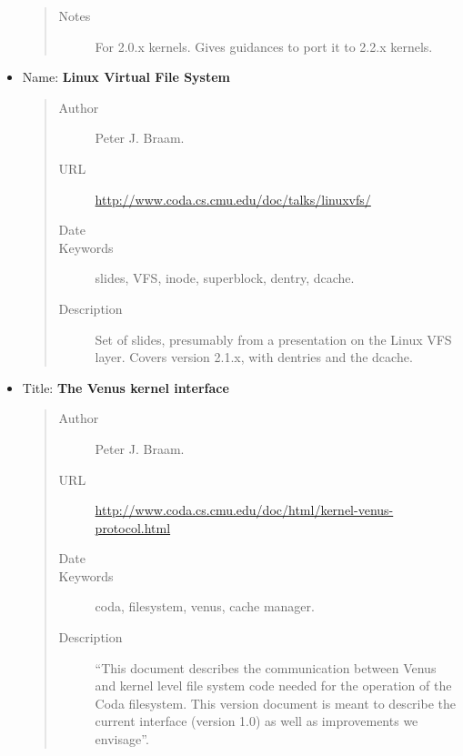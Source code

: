 \documentclass[a4paper,8pt,english]{sphinxmanual}
\begin{document}
\begin{itemize}
\begin{quote}
\begin{description}
\item[{Notes}] \leavevmode
For 2.0.x kernels. Gives guidances to port it to 2.2.x
kernels.

\end{description}\end{quote}

\item {} 
Name: \textbf{Linux Virtual File System}
\begin{quote}\begin{description}
\item[{Author}] \leavevmode
Peter J. Braam.

\item[{URL}] \leavevmode
\href{http://www.coda.cs.cmu.edu/doc/talks/linuxvfs/}{http://www.coda.cs.cmu.edu/doc/talks/linuxvfs/}

\item[{Date}] 

\item[{Keywords}] \leavevmode
slides, VFS, inode, superblock, dentry, dcache.

\item[{Description}] \leavevmode
Set of slides, presumably from a presentation on the
Linux VFS layer. Covers version 2.1.x, with dentries and the
dcache.

\end{description}\end{quote}

\item {} 
Title: \textbf{The Venus kernel interface}
\begin{quote}\begin{description}
\item[{Author}] \leavevmode
Peter J. Braam.

\item[{URL}] \leavevmode
\href{http://www.coda.cs.cmu.edu/doc/html/kernel-venus-protocol.html}{http://www.coda.cs.cmu.edu/doc/html/kernel-venus-protocol.html}

\item[{Date}] 

\item[{Keywords}] \leavevmode
coda, filesystem, venus, cache manager.

\item[{Description}] \leavevmode
``This document describes the communication between
Venus and kernel level file system code needed for the operation
of the Coda filesystem. This version document is meant to describe
the current interface (version 1.0) as well as improvements we
envisage''.


\end{description}
\end{quote}
\end{itemize}
\end{document}
